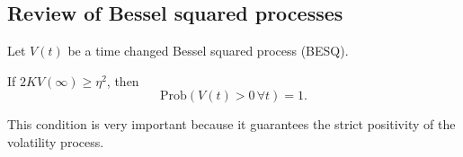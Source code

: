 \subsection{Review of Bessel squared processes}
Let $V(t)$ be a time changed Bessel squared process (BESQ).
\begin{proposition}
    If $2KV(\infty) \ge \eta^2$, then
    \begin{equation*}
        \text{Prob}(V(t)>0\,\forall t) = 1.
    \end{equation*}
\end{proposition}
This condition is very important because it guarantees the strict positivity of the volatility process.
